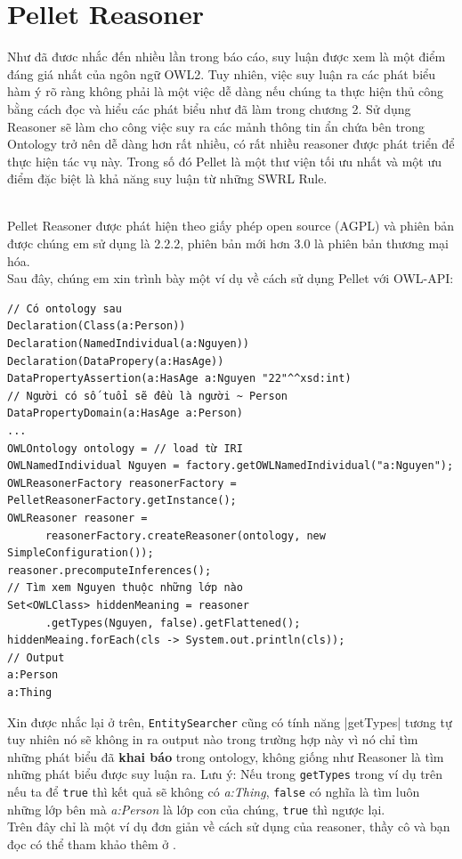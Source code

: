 \section{Pellet Reasoner}
Như đã đươc nhắc đến nhiều lần trong báo cáo, suy luận được xem là một điểm đáng giá nhất của ngôn ngữ OWL2. Tuy nhiên, việc suy luận ra các phát biểu hàm ý rõ ràng không phải là một việc dễ dàng nếu chúng ta thực hiện thủ công bằng cách đọc và hiểu các phát biểu như đã làm trong chương 2. Sử dụng Reasoner sẽ làm cho công việc suy ra các mảnh thông tin ẩn chứa bên trong Ontology trở nên dễ dàng hơn rất nhiều, có rất nhiều reasoner được phát triển để thực hiện tác vụ này. Trong số đó Pellet \cite{pellet} là một thư viện tối ưu nhất và một ưu điểm đặc biệt là khả năng suy luận từ những SWRL Rule.

\\
Pellet Reasoner được phát hiện theo giấy phép open source (AGPL) và phiên bản được chúng em sử dụng là 2.2.2, phiên bản mới hơn 3.0 là phiên bản thương mại hóa.
\\
Sau đây, chúng em xin trình bày một ví dụ về cách sử dụng Pellet với OWL-API:
\begin{verbatim}
// Có ontology sau
Declaration(Class(a:Person))
Declaration(NamedIndividual(a:Nguyen))
Declaration(DataPropery(a:HasAge))
DataPropertyAssertion(a:HasAge a:Nguyen "22"^^xsd:int)
// Người có số tuổi sẽ đều là người ~ Person
DataPropertyDomain(a:HasAge a:Person)
...
OWLOntology ontology = // load từ IRI 
OWLNamedIndividual Nguyen = factory.getOWLNamedIndividual("a:Nguyen"); 
OWLReasonerFactory reasonerFactory = PelletReasonerFactory.getInstance();
OWLReasoner reasoner = 
      reasonerFactory.createReasoner(ontology, new SimpleConfiguration());
reasoner.precomputeInferences();
// Tìm xem Nguyen thuộc những lớp nào
Set<OWLClass> hiddenMeaning = reasoner
      .getTypes(Nguyen, false).getFlattened();
hiddenMeaing.forEach(cls -> System.out.println(cls));
// Output
a:Person
a:Thing
\end{verbatim}
Xin được nhắc lại ở trên, \verb|EntitySearcher| cũng có tính năng |getTypes| tương tự tuy nhiên nó sẽ không in ra output nào trong trường hợp này vì nó chỉ tìm những phát biểu đã \textbf{khai báo} trong ontology, không giống như Reasoner là tìm những phát biểu được suy luận ra. Lưu ý: Nếu trong \verb|getTypes| trong ví dụ trên nếu ta để \verb|true| thì kết quả sẽ không có \textit{a:Thing}, \verb|false| có nghĩa là tìm luôn những lớp bên mà \textit{a:Person} là lớp con của chúng, \verb|true| thì ngược lại.
\\
Trên đây chỉ là một ví dụ đơn giản về cách sử dụng của reasoner, thầy cô và bạn đọc có thể tham khảo thêm ở \cite{pellet}.

